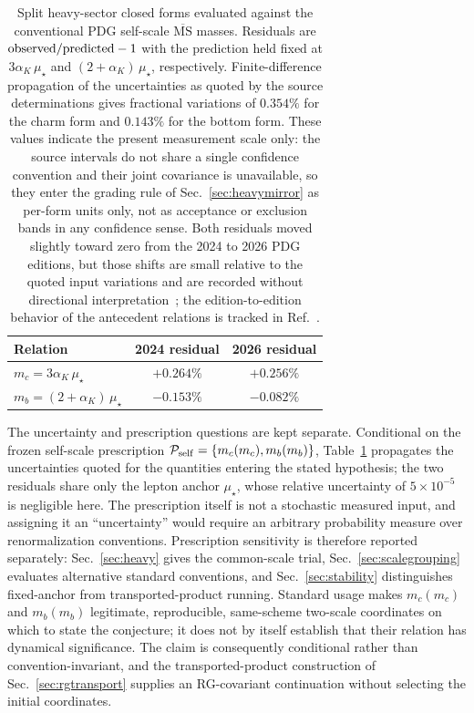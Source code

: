 \documentclass[aps,twocolumn,superscriptaddress,nofootinbib,floatfix]{revtex4-2}
\newcommand{\MSbar}{\overline{\mathrm{MS}}}
\newcommand{\mstar}{\mu_\star}
\newcommand{\alphaK}{\alpha_K}
\begin{document}
\begin{table}[b]
\caption{Split heavy-sector closed forms evaluated against the conventional PDG self-scale $\MSbar$ masses. Residuals are ${\rm observed}/{\rm predicted}-1$ with the prediction held fixed at $3\alphaK\,\mstar$ and $(2+\alphaK)\,\mstar$, respectively. Finite-difference propagation of the uncertainties as quoted by the source determinations gives fractional variations of $0.354\%$ for the charm form and $0.143\%$ for the bottom form. These values indicate the present measurement scale only: the source intervals do not share a single confidence convention and their joint covariance is unavailable, so they enter the grading rule of Sec.~\ref{sec:heavymirror} as per-form units only, not as acceptance or exclusion bands in any confidence sense. Both residuals moved slightly toward zero from the 2024 to 2026 PDG editions, but those shifts are small relative to the quoted input variations and are recorded without directional interpretation~\cite{PDG2024,PDG2026}; the edition-to-edition behavior of the antecedent relations is tracked in Ref.~\cite{BrilliantMPLA}.}
\label{tab:heavy}
\begin{ruledtabular}
\begin{tabular}{lcc}
Relation & 2024 residual & 2026 residual \\
\hline
$m_c=3\alphaK\,\mstar$ & $+0.264\%$ & $+0.256\%$ \\
$m_b=(2+\alphaK)\,\mstar$ & $-0.153\%$ & $-0.082\%$ \\
\end{tabular}
\end{ruledtabular}
\end{table}

The uncertainty and prescription questions are kept separate. Conditional on the frozen self-scale prescription $\mathcal P_{\rm self}=\{m_c(m_c),m_b(m_b)\}$, Table~\ref{tab:heavy} propagates the uncertainties quoted for the quantities entering the stated hypothesis; the two residuals share only the lepton anchor $\mstar$, whose relative uncertainty of $5\times10^{-5}$ is negligible here. The prescription itself is not a stochastic measured input, and assigning it an ``uncertainty'' would require an arbitrary probability measure over renormalization conventions. Prescription sensitivity is therefore reported separately: Sec.~\ref{sec:heavy} gives the common-scale trial, Sec.~\ref{sec:scalegrouping} evaluates alternative standard conventions, and Sec.~\ref{sec:stability} distinguishes fixed-anchor from transported-product running. Standard usage makes $m_c(m_c)$ and $m_b(m_b)$ legitimate, reproducible, same-scheme two-scale coordinates on which to state the conjecture; it does not by itself establish that their relation has dynamical significance. The claim is consequently conditional rather than convention-invariant, and the transported-product construction of Sec.~\ref{sec:rgtransport} supplies an RG-covariant continuation without selecting the initial coordinates.
\end{document}
